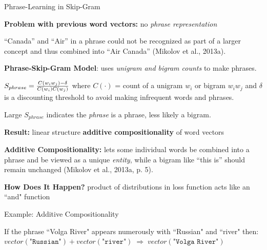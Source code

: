\begin{frame}{Phrase-Learning in Skip-Gram}
    \vfill
    
    \begin{itemizeSpaced}{2pt}
    
        \pinkbox \textbf{Problem with previous word vectors:} no \emph{phrase representation}
        
        \begin{itemizeSpaced}{2pt}
            \arrowitem “Canada” and “Air” in a phrase could not be recognized as part of a larger concept and thus combined into “Air Canada” (Mikolov et al., 2013a).
        \end{itemizeSpaced}
        
        \pinkbox \textbf{Phrase-Skip-Gram Model}: uses \emph{unigram and bigram counts} to make phrases.
        \begin{itemizeSpaced}{2pt}
            
            \item ${\large S_{phrase} = \frac{C(w_i w_j) - \delta} {C(w_i)C(w_j)} }$ where $C(\cdot)$ = count of a unigram $w_i$ or bigram $w_i w_j$ and $\delta$ is a discounting threshold to avoid making infrequent words and phrases.
            
            \item Large $S_{phrase}$ indicates the \emph{phrase} is a phrase, less likely a bigram. 
        \end{itemizeSpaced}
        
        
        \item \textbf{Result: } linear structure \textbf{additive compositionality} of word vectors 
        
        \begin{itemizeSpaced}{2pt}
            \pinkbox \textbf{Additive Compositionality: }lets some individual words be combined into a phrase and be viewed as a unique \emph{entity}, while a bigram like “this is” should remain unchanged (Mikolov et al., 2013a, p. 5).
            
            \item \textbf{How Does It Happen? } product of distributions in loss function acts like an ``and" function
        \end{itemizeSpaced} 
        
        \begin{exampleBlock}{Example: Additive Compositionality}
        
        If the phrase ``Volga River" appears numerously with ``Russian" and ``river" then: $vector(\texttt{"Russian"}) \! + \! vector(\texttt{"river"}) \; \Rightarrow \; vector(\texttt{"Volga River"})$
        
        \end{exampleBlock}
        
        
    \end{itemizeSpaced}
    
\end{frame}